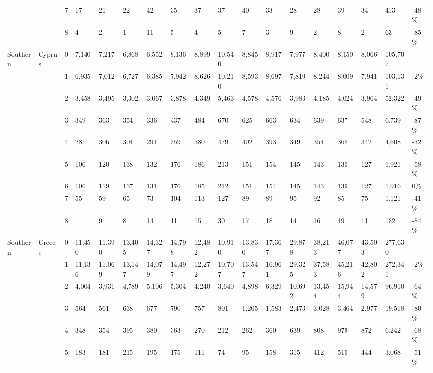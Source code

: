 \begin{longtable}{llllllllllllllllll}
   &  & 7 & 17 & 21 & 22 & 42 & 35 & 37 & 37 & 40 & 33 & 28 & 28 & 39 & 34 & 413 & -48\% \\ 
   &  & 8 & 4 & 2 & 1 & 11 & 5 & 4 & 5 & 7 & 3 & 9 & 2 & 8 & 2 & 63 & -85\% \\ 
  Southern & Cyprus & 0 & 7,140 & 7,217 & 6,868 & 6,552 & 8,136 & 8,899 & 10,540 & 8,845 & 8,917 & 7,977 & 8,400 & 8,150 & 8,066 & 105,707 &  \\ 
   &  & 1 & 6,935 & 7,012 & 6,727 & 6,385 & 7,942 & 8,626 & 10,210 & 8,593 & 8,697 & 7,810 & 8,244 & 8,009 & 7,941 & 103,131 & -2\% \\ 
   &  & 2 & 3,458 & 3,495 & 3,302 & 3,067 & 3,878 & 4,349 & 5,463 & 4,578 & 4,576 & 3,983 & 4,185 & 4,024 & 3,964 & 52,322 & -49\% \\ 
   &  & 3 & 349 & 363 & 354 & 336 & 437 & 484 & 670 & 625 & 663 & 634 & 639 & 637 & 548 & 6,739 & -87\% \\ 
   &  & 4 & 281 & 306 & 304 & 291 & 359 & 380 & 479 & 402 & 393 & 349 & 354 & 368 & 342 & 4,608 & -32\% \\ 
   &  & 5 & 106 & 120 & 138 & 132 & 176 & 186 & 213 & 151 & 154 & 145 & 143 & 130 & 127 & 1,921 & -58\% \\ 
   &  & 6 & 106 & 119 & 137 & 131 & 176 & 185 & 212 & 151 & 154 & 145 & 143 & 130 & 127 & 1,916 & 0\% \\ 
   &  & 7 & 55 & 59 & 65 & 73 & 104 & 113 & 127 & 89 & 89 & 95 & 92 & 85 & 75 & 1,121 & -41\% \\ 
   &  & 8 &  & 9 & 8 & 14 & 11 & 15 & 30 & 17 & 18 & 14 & 16 & 19 & 11 & 182 & -84\% \\ 
  Southern & Greece & 0 & 11,450 & 11,390 & 13,405 & 14,327 & 14,798 & 12,482 & 10,910 & 13,830 & 17,367 & 29,878 & 38,213 & 46,077 & 43,503 & 277,630 &  \\ 
   &  & 1 & 11,136 & 11,069 & 13,147 & 14,079 & 14,497 & 12,272 & 10,707 & 13,547 & 16,961 & 29,325 & 37,583 & 45,216 & 42,802 & 272,341 & -2\% \\ 
   &  & 2 & 4,004 & 3,931 & 4,789 & 5,106 & 5,304 & 4,240 & 3,640 & 4,898 & 6,329 & 10,692 & 13,454 & 15,944 & 14,579 & 96,910 & -64\% \\ 
   &  & 3 & 564 & 561 & 638 & 677 & 790 & 757 & 801 & 1,205 & 1,583 & 2,473 & 3,028 & 3,464 & 2,977 & 19,518 & -80\% \\ 
   &  & 4 & 348 & 354 & 395 & 380 & 363 & 270 & 212 & 262 & 360 & 639 & 808 & 979 & 872 & 6,242 & -68\% \\ 
   &  & 5 & 183 & 181 & 215 & 195 & 175 & 111 & 74 & 95 & 158 & 315 & 412 & 510 & 444 & 3,068 & -51\% \\ 

\end{longtable}
